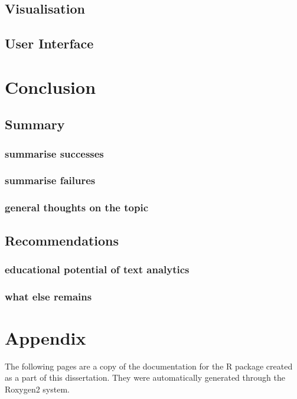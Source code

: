 \documentclass[11pt, a4paper, oneside]{report}
\begin{document}
\section{Visualisation}
\label{sec:visualisation}

\section{User Interface}
\label{sec:user-interface}

\chapter{Conclusion}
\label{cha:conclusion}

\section{Summary}
\label{sec:summary}

\subsection{summarise successes}
\subsection{summarise failures}
\subsection{general thoughts on the topic}

\section{Recommendations}
\label{sec:recommendations}

\subsection{educational potential of text analytics}
\subsection{what else remains}

\chapter{Appendix}
\label{cha:appendix}

The following pages are a copy of the documentation for the R package
created as a part of this dissertation. They were automatically
generated through the Roxygen2 system.



{}
\printglossaries
{}
\printindex
{}
\printbibliography
\end{document}
